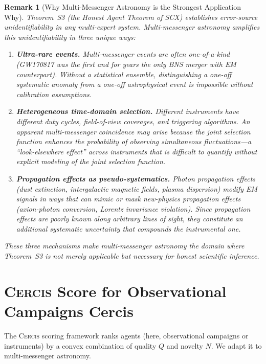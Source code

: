 \documentclass[11pt,a4paper]{article}
\newtheorem{remark}[theorem]{Remark}
\theoremstyle{definition}
\newcommand{\Cercis}{\textsc{Cercis}}
\newcommand{\SCX}{\textsc{SCX}}
\newcommand{\ThmSCXHonest}{Theorem~S3}
\begin{document}
\begin{remark}[Why Multi-Messenger Astronomy is the Strongest Application Why]
\ThmSCXHonest{} (the Honest Agent Theorem of \SCX) establishes error-source unidentifiability in any multi-expert system. Multi-messenger astronomy amplifies this unidentifiability in three unique ways:
\begin{enumerate}[label=(\roman*)]
    \item \textbf{Ultra-rare events.} Multi-messenger events are often one-of-a-kind (GW170817 was the first and for years the only BNS merger with EM counterpart). Without a statistical ensemble, distinguishing a one-off systematic anomaly from a one-off astrophysical event is impossible without calibration assumptions.
    \item \textbf{Heterogeneous time-domain selection.} Different instruments have different duty cycles, field-of-view coverages, and triggering algorithms. An apparent multi-messenger coincidence may arise because the joint selection function enhances the probability of observing simultaneous fluctuations---a ``look-elsewhere effect'' across instruments that is difficult to quantify without explicit modeling of the joint selection function.
    \item \textbf{Propagation effects as pseudo-systematics.} Photon propagation effects (dust extinction, intergalactic magnetic fields, plasma dispersion) modify EM signals in ways that can mimic or mask new-physics propagation effects (axion-photon conversion, Lorentz invariance violation). Since propagation effects are poorly known along arbitrary lines of sight, they constitute an additional systematic uncertainty that compounds the instrumental one.
\end{enumerate}
These three mechanisms make multi-messenger astronomy the domain where \ThmSCXHonest{} is not merely applicable but \textit{necessary} for honest scientific inference.
\end{remark}
\section{\Cercis{} Score for Observational Campaigns Cercis}
\label{sec:cercis}
The \Cercis{} scoring framework \cite{SCX2025} ranks agents (here, observational campaigns or instruments) by a convex combination of quality $Q$ and novelty $N$. We adapt it to multi-messenger astronomy.
\end{document}
